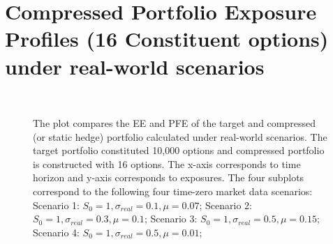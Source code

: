 


\clearpage

\appendix

\section{Compressed Portfolio Exposure Profiles (16 Constituent options) under real-world scenarios} \label{16opt_real_exp}

\begin{figure}[!htb] \centering
  \\
   \caption{The plot compares the EE and PFE of the target and compressed (or static hedge) portfolio calculated under real-world scenarios. The target portfolio constituted 10,000 options and compressed portfolio is constructed with 16 options. The x-axis corresponds to time horizon and y-axis corresponds to exposures. The four subplots correspond to the following four time-zero market data scenarios: Scenario 1: $S_0 =1 , \sigma_{real}=0.1, \mu=0.07$; Scenario 2: $S_0 =1 , \sigma_{real}=0.3, \mu=0.1$; Scenario 3: $S_0 =1 , \sigma_{real}=0.5, \mu=0.15$; Scenario 4: $S_0 =1 , \sigma_{real}=0.5, \mu=0.01$;}\label{EE_Pfl_real_world}\end{figure}




